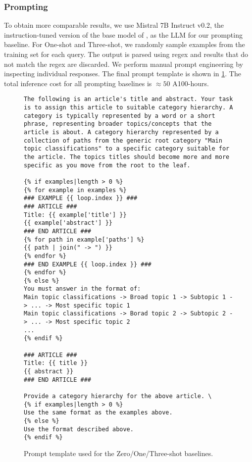 \subsubsection{Prompting}

To obtain more comparable results, we use Mistral 7B Instruct v0.2, the instruction-tuned version of the base model of \name, as the LLM for our prompting baseline. For One-shot and Three-shot, we randomly sample examples from the training set for each query. The output is parsed using regex and results that do not match the regex are discarded. We perform manual prompt engineering by inspecting individual responses. The final prompt template is shown in \cref{fig:prompt-template}. The total inference cost for all prompting baselines is $\approx 50$ A100-hours.



\begin{figure}
\centering
\begin{lstlisting}[frame=single]
The following is an article's title and abstract. Your task is to assign this article to suitable category hierarchy. A category is typically represented by a word or a short phrase, representing broader topics/concepts that the article is about. A category hierarchy represented by a collection of paths from the generic root category "Main topic classifications" to a specific category suitable for the article. The topics titles should become more and more specific as you move from the root to the leaf. 

{% if examples|length > 0 %}
{% for example in examples %}
### EXAMPLE {{ loop.index }} ###
### ARTICLE ###
Title: {{ example['title'] }}
{{ example['abstract'] }}
### END ARTICLE ###
{% for path in example['paths'] %}
{{ path | join(" -> ") }}
{% endfor %}
### END EXAMPLE {{ loop.index }} ###
{% endfor %}
{% else %}
You must answer in the format of:
Main topic classifications -> Broad topic 1 -> Subtopic 1 -> ... -> Most specific topic 1
Main topic classifications -> Borad topic 2 -> Subtopic 2 -> ... -> Most specific topic 2
...
{% endif %}

### ARTICLE ###
Title: {{ title }}
{{ abstract }}
### END ARTICLE ###

Provide a category hierarchy for the above article. \
{% if examples|length > 0 %}
Use the same format as the examples above.
{% else %}
Use the format described above.
{% endif %}
\end{lstlisting}
\caption{Prompt template used for the Zero/One/Three-shot baselines.}
\label{fig:prompt-template}
\end{figure}


